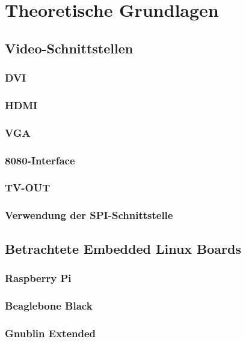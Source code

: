 \chapter{Theoretische Grundlagen}
\label{cha:Grundlagen}

\section{Video-Schnittstellen}
\subsection{DVI}
\subsection{HDMI}
\subsection{VGA}
\subsection{8080-Interface}
\subsection{TV-OUT}
\subsection{Verwendung der SPI-Schnittstelle}

\section{Betrachtete Embedded Linux Boards}
\subsection{Raspberry Pi}
\subsection{Beaglebone Black}
\subsection{Gnublin Extended}

